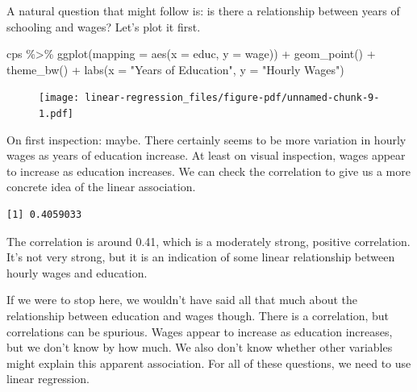 \documentclass[
  letterpaper,
]{book}
\newenvironment{Shaded}{\begin{snugshade}}{\end{snugshade}}
\newcommand{\AttributeTok}[1]{\textcolor[rgb]{0.40,0.45,0.13}{#1}}
\newcommand{\FunctionTok}[1]{\textcolor[rgb]{0.28,0.35,0.67}{#1}}
\newcommand{\NormalTok}[1]{\textcolor[rgb]{0.00,0.23,0.31}{#1}}
\newcommand{\SpecialCharTok}[1]{\textcolor[rgb]{0.37,0.37,0.37}{#1}}
\newcommand{\StringTok}[1]{\textcolor[rgb]{0.13,0.47,0.30}{#1}}
\begin{document}
A natural question that might follow is: is there a relationship between
years of schooling and wages? Let's plot it first.

\begin{Shaded}
\begin{Highlighting}[]
\NormalTok{cps }\SpecialCharTok{\%\textgreater{}\%}
  \FunctionTok{ggplot}\NormalTok{(}\AttributeTok{mapping =} \FunctionTok{aes}\NormalTok{(}\AttributeTok{x =}\NormalTok{ educ,}
                       \AttributeTok{y =}\NormalTok{ wage)) }\SpecialCharTok{+}
  \FunctionTok{geom\_point}\NormalTok{() }\SpecialCharTok{+} \FunctionTok{theme\_bw}\NormalTok{() }\SpecialCharTok{+}
  \FunctionTok{labs}\NormalTok{(}\AttributeTok{x =} \StringTok{"Years of Education"}\NormalTok{,}
       \AttributeTok{y =} \StringTok{"Hourly Wages"}\NormalTok{) }
\end{Highlighting}
\end{Shaded}

\begin{figure}[H]

{\centering \texttt{[image: linear-regression\_files/figure-pdf/unnamed-chunk-9-1.pdf]}

}

\end{figure}

On first inspection: maybe. There certainly seems to be more variation
in hourly wages as years of education increase. At least on visual
inspection, wages appear to increase as education increases. We can
check the correlation to give us a more concrete idea of the linear
association.

\begin{Shaded}
\end{Shaded}

\begin{verbatim}
[1] 0.4059033
\end{verbatim}

The correlation is around 0.41, which is a moderately strong, positive
correlation. It's not very strong, but it is an indication of some
linear relationship between hourly wages and education.

If we were to stop here, we wouldn't have said all that much about the
relationship between education and wages though. There is a correlation,
but correlations can be spurious. Wages appear to increase as education
increases, but we don't know by how much. We also don't know whether
other variables might explain this apparent association. For all of
these questions, we need to use linear regression.
\end{document}
